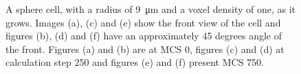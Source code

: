 \begin{figure}[H]
\begin{center}
{	}
	\end{center}
	\begin{center}
	\end{center}
	\caption[Growth of a sphere cell with a radius of 9]{\label{img:GrowthSphereCellRadius9}A sphere cell, with a radius of \SI{9}{\micro\metre} and a voxel density of one, as it grows. Images (a), (c) and (e) show the front view of the cell and figures (b), (d) and (f) have an approximately 45 degrees angle of the front. Figures (a) and (b) are at \ac{MCS} 0, figures (c) and (d) at calculation step 250 and figures (e) and (f) present \ac{MCS} 750.}
\end{figure}

\newpage

